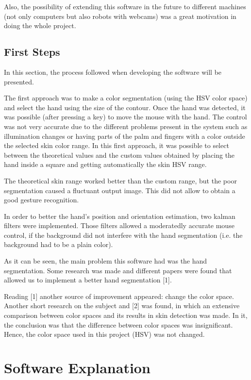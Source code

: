 \documentclass{article}
\begin{document}
Also, the possibility of extending this software in the future to different machines (not only computers but also robots with webcams) was a great motivation in doing the whole project. 


\subsection{First Steps}
In this section, the process followed when developing the software will be presented. 

The first approach was to make a color segmentation (using the HSV color space) and select the hand using the size of the contour. Once the hand was detected, it was possible (after pressing a key) to move the mouse with the hand. The control was not very accurate due to the different problems present in the system such as illumination changes or having parts of the palm and fingers with a color outside the selected skin color range. In this first approach, it was possible to select between the theoretical values and the custom values obtained by placing the hand inside a square and getting automatically the skin HSV range. 

The theoretical skin range worked better than the custom range, but the poor segmentation caused a fluctuant output image. This  did not allow to obtain a good gesture recognition.   

In order to better the hand's position and orientation estimation, two kalman filters were implemented. Those filters allowed a moderatedly accurate mouse control, if the background did not interfere with the hand segmentation (i.e. the background had to be a plain color). 

As it can be seen, the main problem this software had was the hand segmentation. Some research was made and different papers were found that allowed us to implement a better hand segmentation [1].

Reading [1] another source of improvement appeared: change the color space. Another short research on the subject and [2] was found,  in which an extensive comparison between color spaces and its results in skin detection was made. In it, the conclusion was that the difference between color spaces was insignificant. Hence, the color space used in this project (HSV) was not changed. 


  
\section{Software Explanation}
\end{document}

